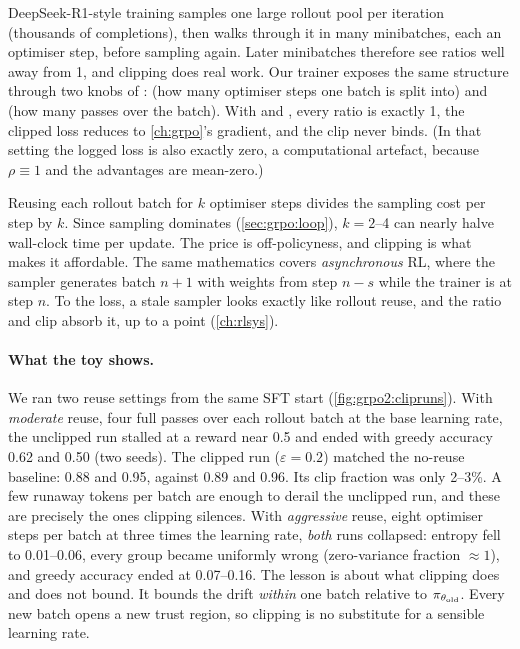 DeepSeek-R1-style training samples one large rollout pool per iteration (thousands of
completions), then walks through it in many minibatches, each an optimiser step, before
sampling again. Later minibatches therefore see ratios well away from 1, and clipping does
real work. Our trainer exposes the same structure through two knobs of
:  (how many optimiser steps one batch is split into) and
 (how many passes over the batch). With  and
, every ratio is exactly 1, the clipped loss reduces to
\cref{ch:grpo}'s gradient, and the clip never binds. (In that setting the logged loss is also
exactly zero, a computational artefact, because $\rho\equiv1$ and the advantages are
mean-zero.)

\begin{systemslens}
Reusing each rollout batch for $k$ optimiser steps divides the sampling cost per step by
$k$. Since sampling dominates (\cref{sec:grpo:loop}), $k=2$--4 can nearly halve wall-clock time
per update. The price is off-policyness, and clipping is what makes it affordable. The same
mathematics covers \emph{asynchronous} RL, where the sampler generates batch $n{+}1$ with
weights from step $n-s$ while the trainer is at step $n$. To the loss, a stale sampler looks
exactly like rollout reuse, and the ratio and clip absorb it, up to a point (\cref{ch:rlsys}).
\end{systemslens}

\paragraph{What the toy shows.} We ran two reuse settings from the same SFT start
(\cref{fig:grpo2:clipruns}). With \emph{moderate} reuse, four full passes over each rollout
batch at the base learning rate, the unclipped run stalled at a reward near 0.5 and ended
with greedy accuracy 0.62 and 0.50 (two seeds). The clipped run ($\varepsilon=0.2$) matched
the no-reuse baseline: 0.88 and 0.95, against 0.89 and 0.96. Its clip fraction was only
2--3\%. A few runaway tokens per batch are enough to derail the unclipped run, and these
are precisely the ones clipping silences. With \emph{aggressive} reuse, eight optimiser steps
per batch at three times the learning rate, \emph{both} runs collapsed: entropy fell to
0.01--0.06, every group became uniformly wrong (zero-variance fraction $\approx1$), and greedy
accuracy ended at 0.07--0.16. The lesson is about what clipping does and does not bound. It
bounds the drift \emph{within} one batch relative to $\pi_{\theta_{\text{old}}}$. Every new batch opens a new
trust region, so clipping is no substitute for a sensible learning rate.

